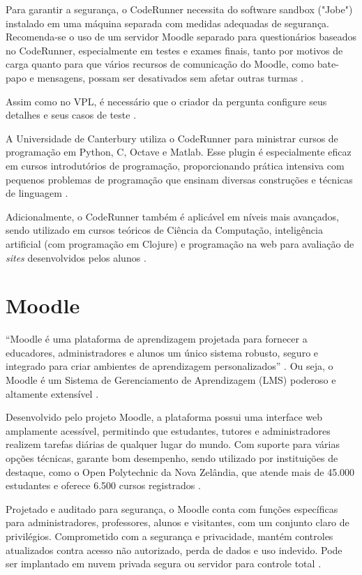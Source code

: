 Para garantir a segurança, o CodeRunner necessita do software sandbox ("Jobe") instalado em uma máquina separada com medidas adequadas de segurança. Recomenda-se o uso de um servidor Moodle separado para questionários baseados no CodeRunner, especialmente em testes e exames finais, tanto por motivos de carga quanto para que vários recursos de comunicação do Moodle, como bate-papo e mensagens, possam ser desativados sem afetar outras turmas \cite{coderunner}.

Assim como no VPL, é necessário que o criador da pergunta configure seus detalhes e seus casos de teste \cite{coderunner}.

A Universidade de Canterbury utiliza o CodeRunner para ministrar cursos de programação em Python, C, Octave e Matlab. Esse plugin é especialmente eficaz em cursos introdutórios de programação, proporcionando prática intensiva com pequenos problemas de programação que ensinam diversas construções e técnicas de linguagem \cite[p.~48]{lobbharlow}. 

Adicionalmente, o CodeRunner também é aplicável em níveis mais avançados, sendo utilizado em cursos teóricos de Ciência da Computação, inteligência artificial (com programação em Clojure) e programação na web para avaliação de \textit{sites} desenvolvidos pelos alunos \cite[p.~48]{lobbharlow}.

\section{Moodle}

“Moodle é uma plataforma de aprendizagem projetada para fornecer a educadores, administradores e alunos um único sistema robusto, seguro e integrado para criar ambientes de aprendizagem personalizados” \cite{moodle}. Ou seja, o Moodle é um Sistema de Gerenciamento de Aprendizagem (LMS) poderoso e altamente extensível \cite{moodle}. 

Desenvolvido pelo projeto Moodle, a plataforma possui uma interface web amplamente acessível, permitindo que estudantes, tutores e administradores realizem tarefas diárias de qualquer lugar do mundo. Com suporte para várias opções técnicas, garante bom desempenho, sendo utilizado por instituições de destaque, como o Open Polytechnic da Nova Zelândia, que atende mais de 45.000 estudantes e oferece 6.500 cursos registrados \cite{moodle}. 

Projetado e auditado para segurança, o Moodle conta com funções específicas para administradores, professores, alunos e visitantes, com um conjunto claro de privilégios. Comprometido com a segurança e privacidade, mantém controles atualizados contra acesso não autorizado, perda de dados e uso indevido. Pode ser implantado em nuvem privada segura ou servidor para controle total \cite{moodle}. 

